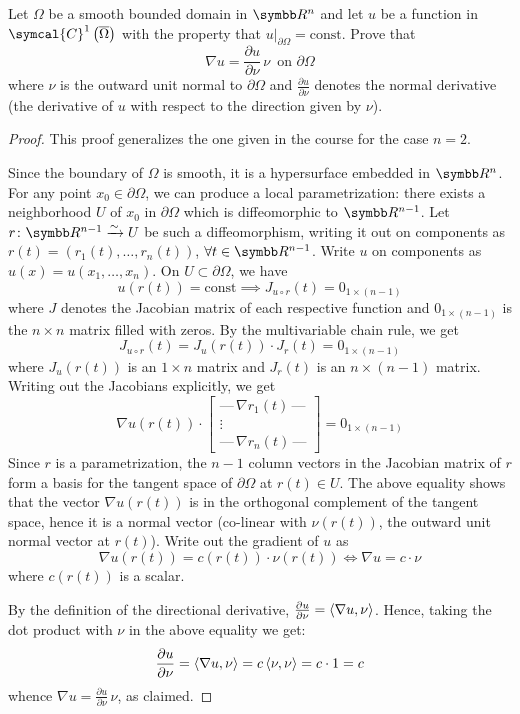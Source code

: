 \begin{exercise}
Let \(\Omega\) be a smooth bounded domain in \(\reals^n\) and let \(u\) be a function in \(\symcal{C}^1 \left(\overline{\Omega}\right)\) with the property that \(\left.u\right|_{\partial \Omega} = \text{const}\). Prove that
\[
    \nabla u = \frac{\partial u}{\partial \nu} \, \nu \, \text{ on \(\partial \Omega\)}
\]
where \(\nu\) is the outward unit normal to \(\partial \Omega\) and \(\frac{\partial u}{\partial \nu}\) denotes the normal derivative (the derivative of \(u\) with respect to the direction given by \(\nu\)).
\end{exercise}
\begin{proof}
This proof generalizes the one given in the course for the case \(n = 2\).

Since the boundary of \(\Omega\) is smooth, it is a hypersurface embedded in \(\reals^n\). For any point \(x_0 \in \partial \Omega\), we can produce a local parametrization: there exists a neighborhood \(U\) of \(x_0\) in \(\partial \Omega\) which is diffeomorphic to \(\reals^{n-1}\). Let \(r \colon \reals^{n-1} \xrightarrow{\sim} U\) be such a diffeomorphism, writing it out on components as \(r(t) = \left(r_1 (t), \dots, r_n (t)\right)\), \(\forall t \in \reals^{n-1}\). Write \(u\) on components as \(u(x) = u\left(x_1, \dots, x_n\right)\). On \(U \subset \partial \Omega\), we have
\[
    u(r(t)) = \text{const} \implies J_{u \circ r} (t) = 0_{1 \times (n - 1)}
\]
where \(J\) denotes the Jacobian matrix of each respective function and \(0_{1 \times (n-1)}\) is the \(n \times n\) matrix filled with zeros. By the multivariable chain rule, we get
\[
     J_{u \circ r} (t) = J_{u} (r(t)) \cdot J_{r} (t) = 0_{1 \times (n - 1)}
\]
where \(J_{u} (r(t))\) is an \(1 \times n\) matrix and \(J_{r} (t)\) is an \(n \times (n - 1)\) matrix.
Writing out the Jacobians explicitly, we get
\[
    \nabla u(r(t))
    \cdot
    \begin{bmatrix}
        \text{---} \, \nabla r_1(t) \, \text{---} \\
        \vdots \\
        \text{---} \, \nabla r_n(t) \, \text{---}
    \end{bmatrix} = 0_{1 \times (n - 1)}
\]
Since \(r\) is a parametrization, the \(n - 1\) column vectors in the Jacobian matrix of \(r\) form a basis for the tangent space of \(\partial \Omega\) at \(r(t) \in U\). The above equality shows that the vector \(\nabla u(r(t))\) is in the orthogonal complement of the tangent space, hence it is a normal vector (co-linear with \(\nu(r(t))\), the outward unit normal vector at \(r(t)\)). Write out the gradient of \(u\) as
\[
    \nabla u (r(t)) = c(r(t)) \cdot \nu(r(t)) \iff \nabla u = c \cdot \nu
\]
where \(c(r(t))\) is a scalar.

By the definition of the directional derivative, \(\frac{\partial u}{\partial \nu} = \left\langle \nabla u, \nu \right\rangle\). Hence, taking the dot product with \(\nu\) in the above equality we get:
\[
    \frac{\partial u}{\partial \nu} = \left\langle \nabla u, \nu \right\rangle = c \left\langle \nu, \nu \right\rangle = c \cdot 1 = c
\]
whence \(\nabla u = \frac{\partial u}{\partial \nu} \, \nu\), as claimed.
\end{proof}

